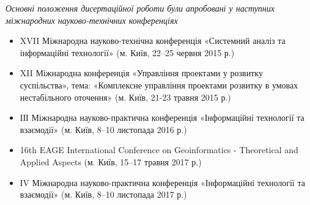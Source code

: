 \begin{center}
	\textit{Основні положення дисертаційної роботи були апробовані у наступних міжнародних науково-технічних конференціях}
\end{center}

\begin{itemize}
	\item XVII Міжнародна науково-технічна конференція «Системний аналіз та інформаційні технології» (м. Київ, 22--25 червня 2015 р.)
	\item XII Міжнародна конференція «Управління проектами у розвитку суспільства», тема: «Комплексне управління проектами розвитку в умовах нестабільного оточення» (м. Київ, 21-23 травня 2015 р.)
	\item ІІІ Міжнародна науково-практична конференція «Інформаційні технології та взаємодії» (м. Київ, 8--10 листопада 2016 р.)
	\item 16th EAGE International Conference on Geoinformatics - Theoretical and Applied Aspects (м. Київ, 15--17 травня 2017 р.)
	\item ІV Міжнародна науково-практична конференція «Інформаційні технології та взаємодії» (м. Київ, 8--10 листопада 2017 р.)
\end{itemize}